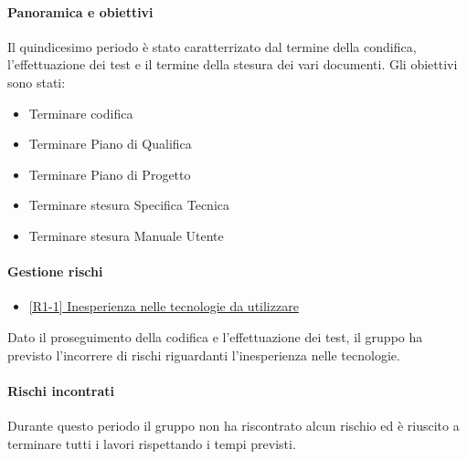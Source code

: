 \documentclass[a4paper,12pt]{article}
\begin{document}
            \paragraph{Panoramica e obiettivi}
            Il quindicesimo periodo è stato caratterrizato dal termine della condifica, l'effettuazione dei test e il termine della stesura dei vari documenti. Gli obiettivi sono stati:
            \begin{itemize}
                \item Terminare codifica
                \item Terminare Piano di Qualifica
                \item Terminare Piano di Progetto
                \item Terminare stesura Specifica Tecnica
                \item Terminare stesura Manuale Utente
            \end{itemize}
            
            \paragraph{Gestione rischi}
                \begin{itemize}
                \item\hyperref[tab:r1]{[R1-1] Inesperienza nelle tecnologie da utilizzare}
                \end{itemize}
                Dato il proseguimento della codifica e l'effettuazione dei test, il gruppo ha previsto l'incorrere di rischi riguardanti l'inesperienza nelle tecnologie.
    
                \paragraph*{Rischi incontrati}
                Durante questo periodo il gruppo non ha riscontrato alcun rischio ed è riuscito a terminare tutti i lavori rispettando i tempi previsti.
                
\end{document}
